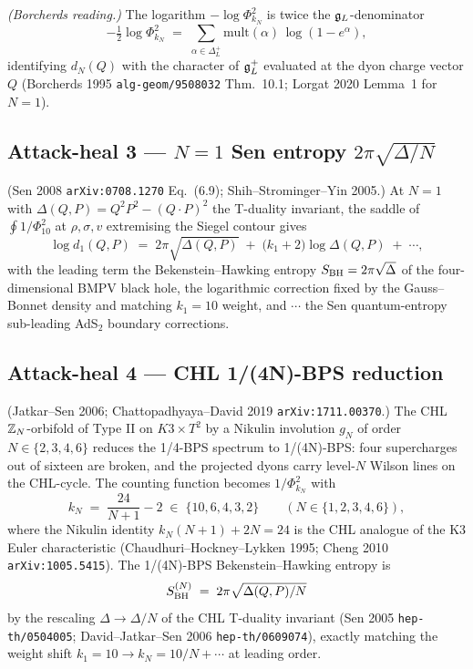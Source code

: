 \ClaimStatusTheorem{} \emph{(Borcherds reading.)} The logarithm
$-\log\Phi_{k_N}^2$ is twice the $\mathfrak{g}_{L}$-denominator
\[
  -\tfrac12\log\Phi_{k_N}^2\;=\;\sum_{\alpha\in\Delta^+_L}
    \mathrm{mult}(\alpha)\,\log(1-e^{\alpha}),
\]
identifying $d_N(Q)$ with the character of $\mathfrak{g}_{L}^+$ evaluated at the
dyon charge vector $Q$ (Borcherds 1995 \texttt{alg-geom/9508032}
Thm.~10.1; Lorgat 2020 Lemma~1 for $N=1$).

\subsection*{Attack-heal 3 --- $N=1$ Sen entropy
  $2\pi\sqrt{\Delta/N}$}

\ClaimStatusTheorem{} (Sen 2008 \texttt{arXiv:0708.1270}
Eq.~(6.9); Shih--Strominger--Yin 2005.) At $N=1$ with
$\Delta(Q,P)=Q^2 P^2 - (Q\cdot P)^2$ the T-duality invariant,
the saddle of $\oint 1/\Phi_{10}^2$ at $\rho,\sigma,v$ extremising
the Siegel contour gives
\[
  \log d_1(Q,P)\;=\;2\pi\sqrt{\Delta(Q,P)}\;+\;
    \bigl(k_1+2\bigr)\log\Delta(Q,P)\;+\;\cdots,
\]
with the leading term the Bekenstein--Hawking entropy
$S_{\mathrm{BH}}=2\pi\sqrt{\Delta}$ of the four-dimensional BMPV black hole,
the logarithmic correction fixed by the Gauss--Bonnet density and
matching $k_1=10$ weight, and $\cdots$ the Sen quantum-entropy
sub-leading AdS$_2$ boundary corrections.

\subsection*{Attack-heal 4 --- CHL 1/(4N)-BPS reduction}

\ClaimStatusTheorem{} (Jatkar--Sen 2006; Chattopadhyaya--David 2019
\texttt{arXiv:1711.00370}.) The CHL $\mathbb{Z}_N$-orbifold of Type II on
$K3\times T^2$ by a Nikulin involution $g_N$ of order
$N\in\{2,3,4,6\}$ reduces the 1/4-BPS spectrum to 1/(4N)-BPS:
four supercharges out of sixteen are broken, and the projected
dyons carry level-$N$ Wilson lines on the CHL-cycle. The counting
function becomes $1/\Phi_{k_N}^2$ with
\[
  k_N\;=\;\frac{24}{N+1}-2\;\in\;\{10,6,4,3,2\}\qquad
  (N\in\{1,2,3,4,6\}),
\]
where the Nikulin identity $k_N(N+1)+2N=24$ is the CHL analogue of
the K3 Euler characteristic (Chaudhuri--Hockney--Lykken 1995;
Cheng 2010 \texttt{arXiv:1005.5415}). The 1/(4N)-BPS Bekenstein--Hawking
entropy is
\[
  S_{\mathrm{BH}}^{(N)}\;=\;2\pi\sqrt{\Delta(Q,P)/N}
\]
by the rescaling $\Delta\to\Delta/N$ of the CHL T-duality invariant
(Sen 2005 \texttt{hep-th/0504005}; David--Jatkar--Sen 2006
\texttt{hep-th/0609074}), exactly matching the weight shift
$k_1=10\to k_N=10/N+\cdots$ at leading order.

